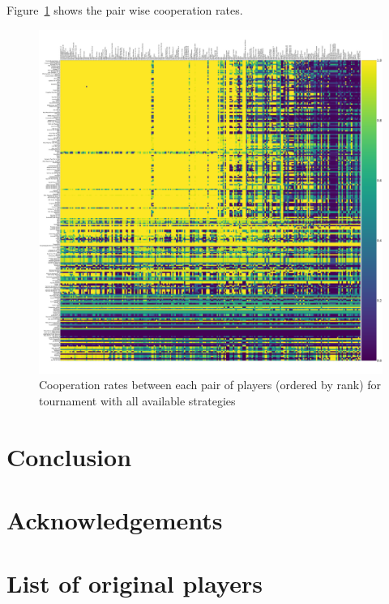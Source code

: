 \documentclass{article}
\begin{document}
Figure~\ref{fig:full_tournament_pairwise_cooperation_rates} shows the pair wise
cooperation rates.

\begin{figure}[!hbtp]
    \centering
    \includegraphics[width=.8\textwidth]{assets/full_tournament_pairwise_cooperation_rates}
    \caption{Cooperation rates between each pair of players (ordered by rank)
    for tournament with all available strategies}
    \label{fig:full_tournament_pairwise_cooperation_rates}
\end{figure}

\section{Conclusion}\label{sec:conclusion}

\section*{Acknowledgements}





\appendix

\section{List of original players}\label{app:list_of_original_players}


\begin{multicols}{2}
    \begin{enumerate}
            
    \end{enumerate}
\end{multicols}
\end{document}
